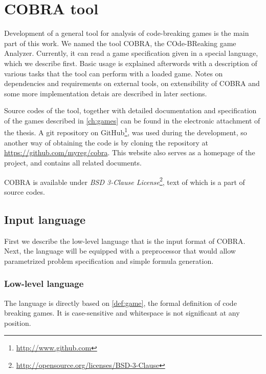 \chapter{COBRA tool}
\label{ch:cobra}
Development of a general tool for analysis of
  code-breaking games is the main part of this work.
We named the tool COBRA, the COde-BReaking game Analyzer.
Currently, it can read a game specification given in a special language, which
  we describe first.
Basic usage is explained afterwords with
  a description of various tasks that the tool can perform with a loaded game.
Notes on dependencies and requirements on external tools,
  on extensibility of COBRA and
  some more implementation detais
  are described in later sections.

Source codes of the tool, together with detailed documentation
  and specification of the games described in \autoref{ch:games}
  can be found in the electronic attachment of the thesis.
A git repository on GitHub\footnote{\url{http://www.github.com}},
  was used during the development,
  so another way of obtaining the code is by cloning
  the repository at \url{https://github.com/myreg/cobra}.
This website also serves as a homepage of the project, and contains
  all related documents.

COBRA is available under \emph{BSD 3-Clause License}\footnote{\url{http://opensource.org/licenses/BSD-3-Clause}},
  text of which is a part of source codes.

\section{Input language}

First we describe the low-level language that is the input format of COBRA.
Next, the language will be equipped with a preprocessor that would allow
  parametrized problem specification and simple formula generation.

\subsection{Low-level language}

The language is directly based on \autoref{def:game}, the formal definition of
  code breaking games.
It is case-sensitive and whitespace is not significant at any position.

\newcommand{\symb}[1]{\;\textcolor{DarkBlue}{\textrm{$<$#1$>$}}\;}
\newcommand{\txt}[1]{\;\textsc{#1}\;}
\newcommand{\term}[1]{\;\textrm{#1}\;}

